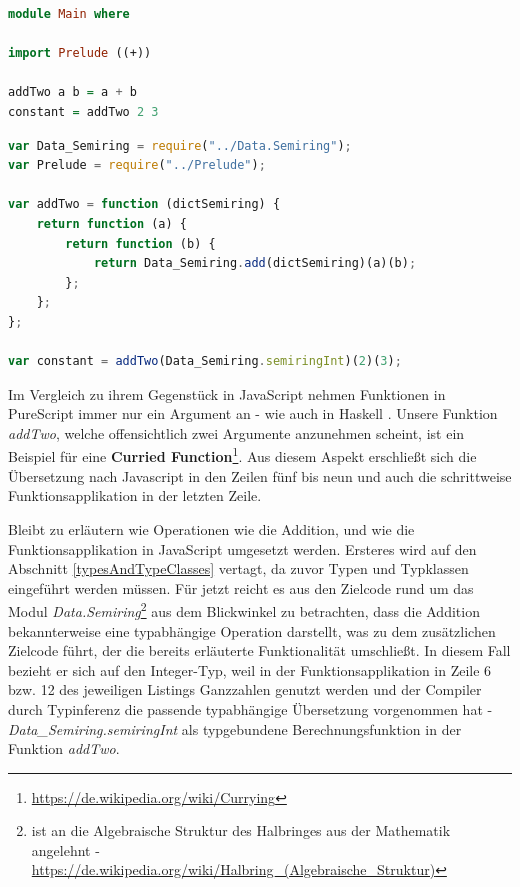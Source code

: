 \documentclass[
12pt,
ngerman,
oneside]
{scrbook} %
\begin{document}
\begin{lstlisting}[language=purescript, style=numbered-and-boxed, caption=Funktionen in PureScript, label=FunctionPS]
module Main where

import Prelude ((+))

addTwo a b = a + b
constant = addTwo 2 3
\end{lstlisting}

\begin{lstlisting}[language=javascript, style=numbered-and-boxed, caption= Funktionen in JavaScript, label=FunctionJS]
var Data_Semiring = require("../Data.Semiring");
var Prelude = require("../Prelude");

var addTwo = function (dictSemiring) {
	return function (a) {
		return function (b) {
			return Data_Semiring.add(dictSemiring)(a)(b);
		};
	};
};

var constant = addTwo(Data_Semiring.semiringInt)(2)(3);
\end{lstlisting}

Im Vergleich zu ihrem Gegenstück in JavaScript nehmen Funktionen in PureScript immer nur ein Argument an - wie auch in Haskell \cites[][]{PSTypes18}[][Kap. Higher order functions, Abschn. Curried functions]{Haskell11}. Unsere Funktion \emph{addTwo}, welche offensichtlich zwei Argumente anzunehmen scheint, ist ein Beispiel für eine \textbf{Curried Function}\footnote{\href{https://de.wikipedia.org/wiki/Currying}{https://de.wikipedia.org/wiki/Currying}}. Aus diesem Aspekt erschließt sich die Übersetzung nach Javascript in den Zeilen fünf bis neun und auch die schrittweise Funktionsapplikation in der letzten Zeile. 

Bleibt zu erläutern wie Operationen wie die Addition, und wie die Funktionsapplikation in JavaScript umgesetzt werden. Ersteres wird auf den Abschnitt  \glqq \ref{typesAndTypeClasses} \grqq{} vertagt, da zuvor Typen und Typklassen eingeführt werden müssen. Für jetzt reicht es aus den Zielcode rund um das Modul \emph{Data.Semiring}\footnote{ist an die Algebraische Struktur des Halbringes aus der Mathematik angelehnt - \href{https://de.wikipedia.org/wiki/Halbring_(Algebraische_Struktur)}{https://de.wikipedia.org/wiki/Halbring_(Algebraische_Struktur)}} aus dem Blickwinkel zu betrachten, dass die Addition bekannterweise eine typabhängige Operation darstellt, was zu dem zusätzlichen Zielcode führt, der die bereits erläuterte Funktionalität umschließt. In diesem Fall bezieht er sich auf den Integer-Typ, weil in der Funktionsapplikation in Zeile 6 bzw. 12 des jeweiligen Listings Ganzzahlen genutzt werden und der Compiler durch Typinferenz die passende typabhängige Übersetzung vorgenommen hat - \emph{\mbox{Data_Semiring.semiringInt}} als typgebundene Berechnungsfunktion in der Funktion \emph{addTwo}.
\end{document}
